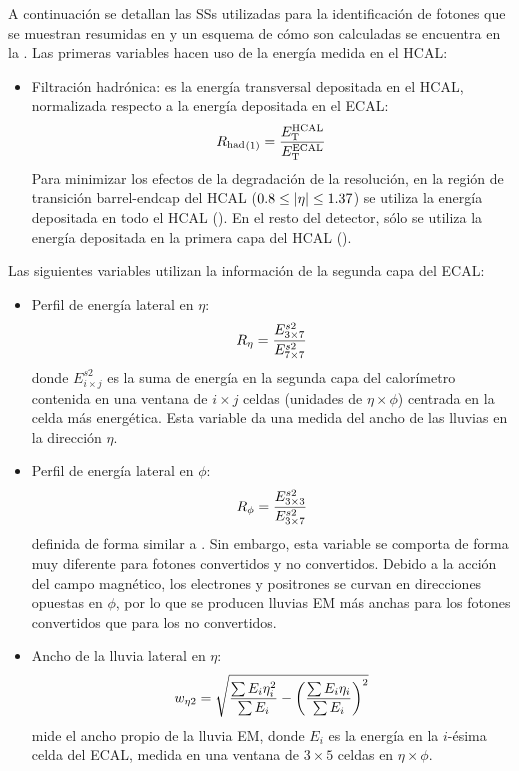 A continuación se detallan las \acp{SS} utilizadas para la identificación de fotones que se muestran resumidas en \Tab{\ref{tab:pid_ss:ss:ss_variables}} y un esquema de cómo son calculadas se encuentra en la \Fig{\ref{fig:pid_ss:ss:ss_variables}}.
Las primeras variables hacen uso de la energía medida en el \ac{HCAL}:
\begin{itemize}
    \item Filtración hadrónica: es la energía transversal depositada en el \ac{HCAL}, normalizada respecto a la energía depositada en el \ac{ECAL}:
        \begin{equation}
            {\ensuremath{R_{\text{had}}}}_{(1)} = \frac{E_{\text{T}}^{\text{HCAL}}}{E_{\text{T}}^{\text{ECAL}}}
        \end{equation}
        Para minimizar los efectos de la degradación de la resolución, en la región de transición barrel-endcap del \ac{HCAL} (\(0.8\leq |\eta|\leq 1.37\)) se utiliza la energía depositada en todo el \ac{HCAL} (\rhad). En el resto del detector, sólo se utiliza la energía depositada en la primera capa del \ac{HCAL} (\rhado).
\end{itemize}
Las siguientes variables utilizan la información de la segunda capa del \ac{ECAL}:
\begin{itemize}
    \item Perfil de energía lateral en \(\eta\):
        \begin{equation}
            R_{\eta} = \frac{E_{3\times7}^{s2}}{E_{7\times7}^{s2}}
        \end{equation}
        donde \(E_{i\times j}^{s2}\) es la suma de energía en la segunda capa del calorímetro contenida en una ventana de \(i \times j \) celdas (unidades de \(\eta \times \phi\)) centrada en la celda más energética. Esta variable da una medida del ancho de las lluvias en la dirección \(\eta\).
    \item Perfil de energía lateral en \(\phi\):
        \begin{equation}
            R_{\phi} = \frac{E_{3\times3}^{s2}}{E_{3\times7}^{s2}}
        \end{equation}
        definida de forma similar a \reta. Sin embargo, esta variable se comporta de forma muy diferente para fotones convertidos y no convertidos. Debido a la acción del campo magnético, los electrones y positrones se curvan en direcciones opuestas en \(\phi\), por lo que se producen lluvias \ac{EM} más anchas para los fotones convertidos que para los no convertidos.
    \item Ancho de la lluvia lateral en \(\eta\):
        \begin{equation}
            w_{\eta 2} = \sqrt{
                \frac{\sum E_i \eta_i^2}{\sum E_i}
                -
                \left(\frac{\sum E_i \eta_i}{\sum E_i}\right)^2
            }
        \end{equation}
        mide el ancho propio de la lluvia \ac{EM}, donde \(E_i\) es la energía en la \(i\)-ésima celda del \ac{ECAL}, medida en una ventana de \(3\times 5 \) celdas en \(\eta \times \phi\).
\end{itemize}
